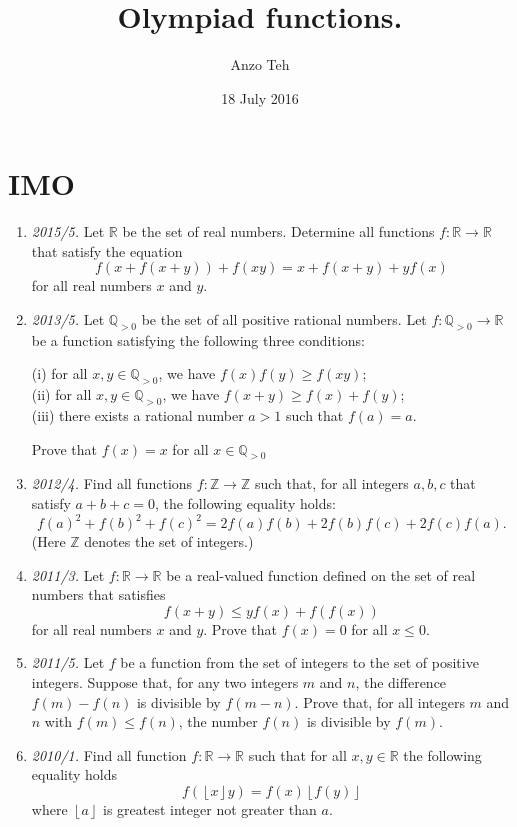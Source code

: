 \documentclass[11pt,a4paper]{article}
\begin{document}
\title{Olympiad functions.}
\author{Anzo Teh}
\date{18 July 2016}
\maketitle

\section{IMO}
\begin{enumerate}
\item\emph{2015/5.} Let $\mathbb R$ be the set of real numbers. Determine all functions $f:\mathbb R\to\mathbb R$ that satisfy the equation\[f(x+f(x+y))+f(xy)=x+f(x+y)+yf(x)\]for all real numbers $x$ and $y$.

\item\emph{2013/5.} Let $\mathbb Q_{>0}$ be the set of all positive rational numbers. Let $f:\mathbb Q_{>0}\to\mathbb R$ be a function satisfying the following three conditions:

(i) for all $x,y\in\mathbb Q_{>0}$, we have $f(x)f(y)\geq f(xy)$;\\
(ii) for all $x,y\in\mathbb Q_{>0}$, we have $f(x+y)\geq f(x)+f(y)$;\\
(iii) there exists a rational number $a>1$ such that $f(a)=a$.

Prove that $f(x)=x$ for all $x\in\mathbb Q_{>0}$

\item\emph{2012/4.} Find all functions $f:\mathbb Z\rightarrow \mathbb Z$ such that, for all integers $a,b,c$ that satisfy $a+b+c=0$, the following equality holds:
\[f(a)^2+f(b)^2+f(c)^2=2f(a)f(b)+2f(b)f(c)+2f(c)f(a).\]
(Here $\mathbb{Z}$ denotes the set of integers.)

\item\emph{2011/3.} Let $f : \mathbb R \to \mathbb R$ be a real-valued function defined on the set of real numbers that satisfies
\[f(x + y) \leq yf(x) + f(f(x))\]
for all real numbers $x$ and $y$. Prove that $f(x) = 0$ for all $x \leq 0$.

\item\emph{2011/5.}  Let $f$ be a function from the set of integers to the set of positive integers. Suppose that, for any two integers $m$ and $n$, the difference $f(m) - f(n)$ is divisible by $f(m- n)$. Prove that, for all integers $m$ and $n$ with $f(m) \leq f(n)$, the number $f(n)$ is divisible by $f(m)$.

\item\emph{2010/1.} Find all function $f:\mathbb{R}\rightarrow\mathbb{R}$ such that for all $x,y\in\mathbb{R}$ the following equality holds \[ f(\left\lfloor x\right\rfloor y)=f(x)\left\lfloor f(y)\right\rfloor \] where $\left\lfloor a\right\rfloor $ is greatest integer not greater than $a.$


\end{enumerate}
\end{document}
